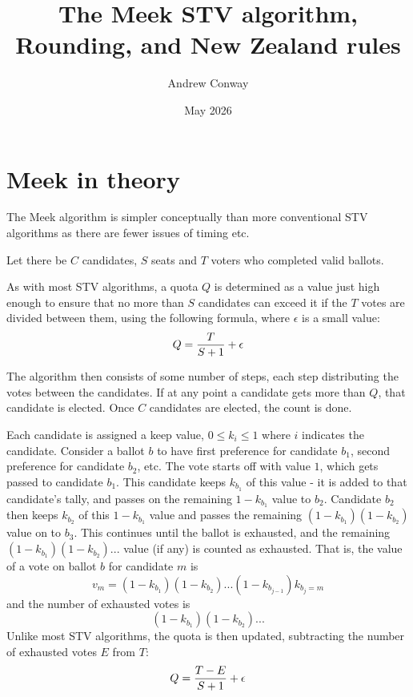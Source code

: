 \documentclass{article}
\title{The Meek STV algorithm, Rounding, and New Zealand rules}
\author{Andrew Conway}
\date{May 2026}
\begin{document}
\maketitle

\section{Meek in theory}

The Meek algorithm\cite{meek_nouvelle_1969,meek_1969_en,meek_1970_en} is simpler conceptually than more conventional STV algorithms
as there are fewer issues of timing etc.

Let there be $C$ candidates, $S$ seats and $T$ voters who completed valid ballots.

As with most STV algorithms, a quota $Q$ is determined as a value just high enough to
ensure that no more than $S$ candidates can exceed it if the $T$ votes are divided
between them, using the following formula, where $\epsilon$ is a small value:
\begin{equation} \label{eq:quota_original}
    Q = {{T}\over{S+1}} + \epsilon
\end{equation}

The algorithm then consists of some number of steps, each step distributing the 
votes between the candidates. If at any point a candidate gets more than $Q$, that
candidate is elected. Once $C$ candidates are elected, the count is done.

Each candidate is assigned a keep value, $0\leq k_i\leq 1$ where $i$ indicates the candidate.
Consider a ballot $b$ to have first preference for candidate $b_1$, second preference
for candidate $b_2$, etc. The vote starts off with value $1$, which gets passed to
candidate $b_1$. This candidate keeps $k_{b_1}$ of this value - it is added to that
candidate's tally, and passes on the remaining $1-k_{b_1}$ value to $b_2$.
Candidate $b_2$ then keeps $k_{b_2}$ of this $1-k_{b_1}$ value and passes the
remaining $(1-k_{b_1})(1-k_{b_2})$ value on to $b_3$. This continues until the
ballot is exhausted, and the remaining $(1-k_{b_1})(1-k_{b_2})...$ value (if any)
is counted as exhausted. That is, the value of a vote on ballot $b$ for candidate $m$
is
\begin{equation} \label{eq:vm}
    v_m = (1-k_{b_1})(1-k_{b_2})...(1-k_{b_{j-1}})k_{b_j=m}
\end{equation}
and the number of exhausted votes is
\begin{equation} \label{eq:exhaust}
    (1-k_{b_1})(1-k_{b_2})...
\end{equation}
Unlike most STV algorithms, the quota is then updated,
subtracting the number of exhausted votes $E$ from $T$:
\begin{equation} \label{eq:quota}
    Q = {{T-E}\over{S+1}} + \epsilon
\end{equation}
\end{document}
